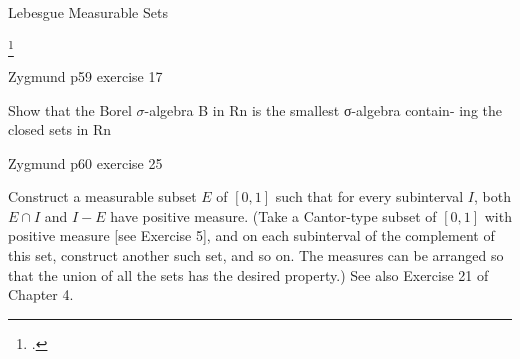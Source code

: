 \documentclass[UTF8,a4paper,10pt]{article}
\begin{document}
\begin{mybox}{Lebesgue Measurable Sets}

  
\footcite[][45-46]{Wheeden_Zygmund_2015}  




\end{mybox}



  \begin{Problem}[]{Zygmund p59 exercise 17}

    Show that the Borel \(\sigma\)-algebra B in Rn is the smallest σ-algebra contain-
    ing the closed sets in Rn

  \end{Problem}

\pagebreak

  \begin{Problem}[]{Zygmund p60 exercise 25}

    Construct a measurable subset \(E\) of \([0, 1]\) such that for every subinterval \(I\), both \(E \cap  I\) and \(I - E\) have positive measure. (Take a Cantor-type subset of \([0, 1]\) with positive measure [see Exercise 5], and on each subinterval of the complement of this set, construct another such set, and so on. The measures can be arranged so that the union of all the sets has the desired property.) See also Exercise 21 of Chapter 4.

  \end{Problem}
\end{document}
